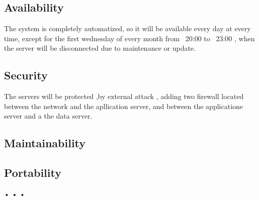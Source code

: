   \subsection{Availability}
  The system is completely automatized, so it will be available every day at every time, except for the first wednesday of every month from ~20:00 to ~23:00 , when the server will be disconnected due to maintenance or update.
  \subsection{Security}
  The servers will be protected ,by external attack , adding two firewall located between the network and the apllication server, and between the applicatione server and a the data server.
  \subsection{Maintainability}
  
  \subsection{Portability}
 • • •
                                                                                                                                                                                                                                                                                                                                                                                                                                                                                                                                                                                                                                                                                                                                                                                                                                                                                                                                                                                                                                                                                                                  
